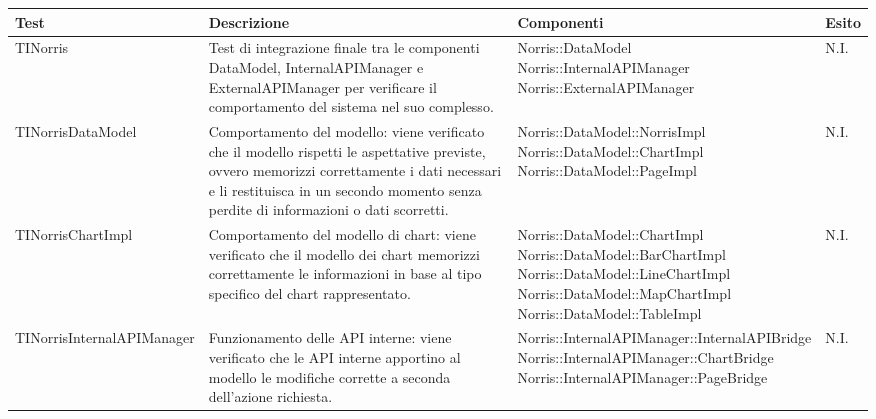
\begin{longtabu}{| X | X | X | X[0.5] |}

			\hline
			\rowfont{\bf}
			Test &
			Descrizione &
			Componenti &
			Esito \\
			\hline \endhead




	TINorris
	&
Test di integrazione finale tra le componenti DataModel, InternalAPIManager e ExternalAPIManager per verificare il comportamento del sistema nel suo complesso.
& \parbox[t]{0.6\textwidth}{
Norris::DataModel\\
Norris::InternalAPIManager\\
Norris::ExternalAPIManager}
			& N.I.
			\\ \hline



	TINorrisDataModel
	&
Comportamento del modello: viene verificato che il modello rispetti le aspettative previste, ovvero memorizzi correttamente i dati necessari e li restituisca in un secondo momento senza perdite di informazioni o dati scorretti.
& \parbox[t]{0.6\textwidth}{
Norris::DataModel::NorrisImpl\\
Norris::DataModel::ChartImpl\\
Norris::DataModel::PageImpl}
			& N.I.
			\\ \hline



	TINorrisChartImpl
	&
Comportamento del modello di chart: viene verificato che il modello dei chart memorizzi correttamente le informazioni in base al tipo specifico del chart rappresentato.
& \parbox[t]{0.6\textwidth}{
Norris::DataModel::ChartImpl\\
Norris::DataModel::BarChartImpl\\
Norris::DataModel::LineChartImpl\\
Norris::DataModel::MapChartImpl\\
Norris::DataModel::TableImpl}
			& N.I.
			\\ \hline



	TINorrisInternalAPIManager
	&
Funzionamento delle API interne: viene verificato che le API interne apportino al modello le modifiche corrette a seconda dell'azione richiesta.
& \parbox[t]{0.6\textwidth}{
Norris::InternalAPIManager::InternalAPIBridge\\
Norris::InternalAPIManager::ChartBridge\\
Norris::InternalAPIManager::PageBridge}
			& N.I.
			\\ \hline




\end{longtabu}
